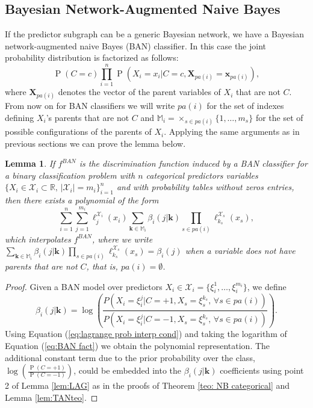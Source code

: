 \documentclass[11pt,a4paper, twoside]{book}
\newtheorem{lemma}{Lemma}[chapter]
\newcommand{\Pp}{\operatorname{P}}
\newcommand{\nchi}{\mathcal{X}}
\begin{document}
\subsection{Bayesian Network-Augmented Naive Bayes}
\label{subsec:BAN}
If the predictor subgraph can be a generic Bayesian network, we have a Bayesian network-augmented naive Bayes (BAN) classifier. In this case the joint probability distribution is factorized as follows:
\begin{equation}
\label{eq:BAN fact}
\Pp\left(C=c\right)\prod_{i=1}^n \Pp\left(X_i=x_i|C=c, \mathbf{X}_{{pa}(i)}=\mathbf{x}_{{pa}(i)}\right) ,
\end{equation}
where $\mathbf{X}_{{pa}(i)}$ denotes the vector of the parent variables of $X_i$ that are not $C$. 
From now on for BAN classifiers we will write ${pa}(i)$ for the set of indexes defining $X_i$'s parents that are not $C$ and $\mathbb{M}_i=\times_{s\in {pa}(i)} \{1,\ldots,m_s\} $ for the set of possible configurations of the parents of $X_i$.
Applying the same arguments as in previous sections  we can prove the lemma below.
\begin{lemma}
\label{lem:BAN}
If $f^{BAN}$ is the discrimination function induced by a BAN classifier for a {binary} classification problem with $n$ categorical predictors variables $\{X_i \in \nchi_i\subset\mathbb{R} \text{, } |\nchi_i|=m_i\}_{i=1}^n$ { and  with probability tables without zeros entries}, then there exists a polynomial of the form 
\[ \sum_{i=1}^{n}  \sum_{j=1}^{m_i}\ell_{j}^{\nchi_i}(x_i) \sum_{\mathbf{k}\in \mathbb{M}_i} \beta_{i}(j|\mathbf{k})\prod_{s\in {pa}(i)} \ell_{k_s}^{\nchi_{s}}(x_{s}) ,  \]
which interpolates $f^{BAN}$, where we write $\sum_{\mathbf{k}\in \mathbb{M}_i} \beta_{i}(j|\mathbf{k})\prod_{s\in {pa}(i)} \ell_{k_s}^{\nchi_{s}}(x_{s})=\beta_{i}(j)$ when a variable does not have parents that are not $C$, that is, ${pa}(i)=\emptyset$.
\end{lemma}
\begin{proof}
Given a BAN model over predictors $X_i \in \nchi_i=\{\xi_i^1,\ldots,\xi_i^{m_i}\}$, we define 
\[ \beta_{i}(j|\mathbf{k})=\log \left( \frac{P\left(X_i=\xi_i^j|C=+1, X_s=\xi_s^{k_s} \text{, } \forall s\in {pa}(i)  \right) }{P\left(X_i=\xi_i^j|C=-1, X_s=\xi_s^{k_s} \text{, }\forall s\in {pa}(i)  \right)} \right) .\]
Using Equation (\ref{eq:lagrange prob interp cond}) and taking the logarithm of Equation (\ref{eq:BAN fact}) we obtain the polynomial representation. The additional constant term due to the prior probability over the class, $\log \left( \frac{\Pp(C=+1)}{\Pp(C=-1)}\right)$, could be embedded into the $\beta_i(j|\mathbf{k})$ coefficients using point 2 of Lemma \ref{lem:LAG} as in the proofs of Theorem \ref{teo: NB categorical} and Lemma \ref{lem:TANteo}.
\end{proof}
\end{document}
